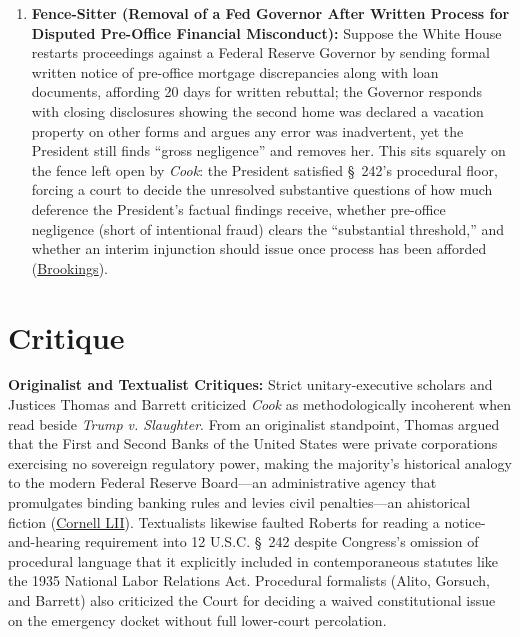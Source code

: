 \documentclass[12pt]{article}
\begin{document}
\begin{enumerate}
    \item \textbf{Fence-Sitter (Removal of a Fed Governor After Written Process for Disputed Pre-Office Financial Misconduct):} Suppose the White House restarts proceedings against a Federal Reserve Governor by sending formal written notice of pre-office mortgage discrepancies along with loan documents, affording 20 days for written rebuttal; the Governor responds with closing disclosures showing the second home was declared a vacation property on other forms and argues any error was inadvertent, yet the President still finds ``gross negligence'' and removes her. This sits squarely on the fence left open by \textit{Cook}: the President satisfied \S~242's procedural floor, forcing a court to decide the unresolved substantive questions of how much deference the President's factual findings receive, whether pre-office negligence (short of intentional fraud) clears the ``substantial threshold,'' and whether an interim injunction should issue once process has been afforded (\href{https://www.brookings.edu/articles/fed-independence-after-trump-v-cook/}{Brookings}).
\end{enumerate}

\section{Critique}

\textbf{Originalist and Textualist Critiques:} Strict unitary-executive scholars and Justices Thomas and Barrett criticized \textit{Cook} as methodologically incoherent when read beside \textit{Trump v. Slaughter}. From an originalist standpoint, Thomas argued that the First and Second Banks of the United States were private corporations exercising no sovereign regulatory power, making the majority's historical analogy to the modern Federal Reserve Board---an administrative agency that promulgates binding banking rules and levies civil penalties---an ahistorical fiction (\href{https://www.law.cornell.edu/supremecourt/text/25A312}{Cornell LII}). Textualists likewise faulted Roberts for reading a notice-and-hearing requirement into 12 U.S.C. \S~242 despite Congress's omission of procedural language that it explicitly included in contemporaneous statutes like the 1935 National Labor Relations Act. Procedural formalists (Alito, Gorsuch, and Barrett) also criticized the Court for deciding a waived constitutional issue on the emergency docket without full lower-court percolation.
\end{document}
